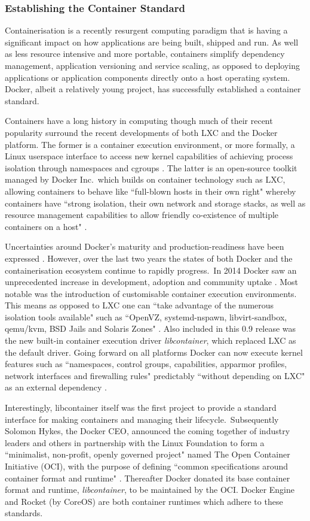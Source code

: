 \documentclass{report}
\begin{document}
\subsubsection{Establishing the Container Standard}
Containerisation is a recently resurgent computing paradigm that is
having a significant impact on how applications are being built,
shipped and run. As well as less resource intensive and
more portable, containers simplify dependency management, application
versioning and service scaling, as opposed to deploying
applications or application components directly onto a host operating
system. Docker, albeit a relatively young project, has successfully
established a container standard.
\par
Containers have a long history in computing though much of their recent popularity 
surround the recent developments of both LXC and the Docker platform. 
The former is a container execution environment,
or more formally, a Linux userspace interface to 
access new kernel capabilities of achieving process isolation through namespaces
and cgroups \citep{Claus}. The latter is an open-source toolkit managed by Docker Inc.\ which
builds on container technology such as LXC, 
allowing containers to behave like ``full-blown hosts in their own right" 
whereby containers have ``strong isolation, their own network and storage stacks, as well 
as resource management capabilities to allow friendly co-existence of multiple containers on a host" \citep{db}.
\par 
Uncertainties around Docker's maturity and production-readiness have been expressed \citep{Kereki, Powers, Merkel}.
However, over the last two years the states of both Docker and the containerisation ecosystem continue to rapidly progress.\
In 2014 Docker saw an unprecedented increase in development, adoption and community uptake \citep{Merkel}. Most
notable was the introduction of customisable container execution environments. This means as opposed to LXC one can
``take advantage of the numerous isolation tools available" such as ``OpenVZ, systemd-nspawn, libvirt-sandbox, qemu/kvm, BSD Jails and Solaris Zones"
\citep{Hykes}.
Also included in this 0.9 release was the new built-in container execution driver \textit{libcontainer}, which replaced LXC as the default driver.
Going forward on all platforms Docker can now execute kernel features such as ``namespaces, control groups, capabilities, apparmor profiles, 
network interfaces and firewalling rules" predictably ``without depending on LXC" as an external dependency \citep{Hykes}. 
\par
Interestingly, libcontainer itself was the first project to provide a standard interface for making containers and managing their lifecycle.\
Subsequently Solomon Hykes, the Docker CEO, announced the coming together of industry leaders and others in partnership with the Linux Foundation
to form a ``minimalist, non-profit, openly governed project" named The Open Container Initiative (OCI), with the purpose of defining 
``common specifications around container format and runtime" \citep{Golub}. 
Thereafter Docker donated its base container format and runtime, \textit{libcontainer}, to be maintained by the OCI. Docker Engine and Rocket (by CoreOS) are both
container runtimes which adhere to these standards. 
\end{document}

